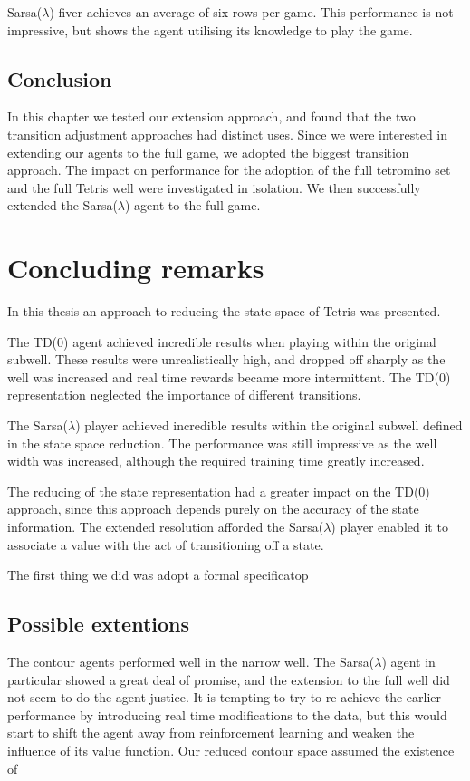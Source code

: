 \documentclass{rucsthesis}
\begin{document}
Sarsa($\lambda$) fiver achieves an average of six rows per game.
This performance is not impressive, but shows the agent utilising its knowledge to play the game.

\section{Conclusion}

In this chapter we tested our extension approach, and found that the two transition adjustment approaches had distinct uses. Since we were interested in extending our agents to the full game, we adopted the biggest transition approach. The impact on performance for the adoption of the full tetromino set and the full Tetris well were investigated in isolation. We then successfully extended the Sarsa($\lambda$) agent to the full game. 

\chapter{Concluding remarks}

In this thesis an approach to reducing the state space of Tetris was presented.

The TD(0) agent achieved incredible results when playing within the original subwell. These results were unrealistically high, and dropped off sharply as the well was increased and real time rewards became more intermittent. The TD(0) representation neglected the importance of different transitions.

The Sarsa($\lambda$) player achieved incredible results within the original subwell defined in the state space reduction. The performance was still impressive as the well width was increased, although the required training time greatly increased.

The reducing of the state representation had a greater impact on the TD(0) approach, since this approach depends purely on the accuracy of the state information. The extended resolution afforded the Sarsa($\lambda$) player enabled it to associate a value with the act of transitioning off a state. 

The first thing we did was adopt a formal specificatop

\section{Possible extentions}

The contour agents performed well in the narrow well. The Sarsa($\lambda$) agent in particular showed a great deal of promise, and the extension to the full well did not seem to do the agent justice. It is tempting to try to re-achieve the earlier performance by introducing real time modifications to the data, but this would start to shift the agent away from reinforcement learning and weaken the influence of its value function. Our reduced contour space assumed the existence of 
\end{document}
